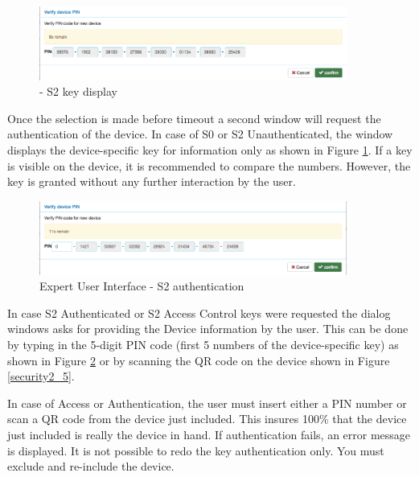 \begin{figure}
\begin{center}
\includegraphics[width=0.9\textwidth]{pngs/cap7/security2_3.png}
\caption{\zweui - S2 key display}
\label{security2_3}
\end{center}
\end{figure}


Once the selection is made before timeout a second window  will request 
the authentication of the device. In case of S0 or S2 Unauthenticated, the window 
displays the device-specific key for information only as shown in Figure \ref{security2_3}. 
If a key is visible on the device, it is recommended to compare the numbers. However, 
the key is granted without any further interaction by the user.

\begin{figure}
\begin{center}
\includegraphics[width=0.9\textwidth]{pngs/cap7/security2_4.png}
\caption{Expert User Interface - S2 authentication}
\label{security2_4}
\end{center}
\end{figure}


In case S2 Authenticated or S2 Access Control keys were requested the 
dialog windows asks for providing the Device information by the user. This can be done 
by typing in the 5-digit PIN code (first 5 numbers of the device-specific key) as shown
in Figure \ref{security2_4} or by 
scanning the QR code on the device shown in Figure \ref{security2_5}.

In case of Access or Authentication, the user must insert either a PIN 
number or scan a QR code from the device just included. This insures 100\% that the device 
just included is really the device in hand.
If authentication fails, an error message is displayed. It is not possible to redo 
the key authentication only. You must exclude and re-include the device.


